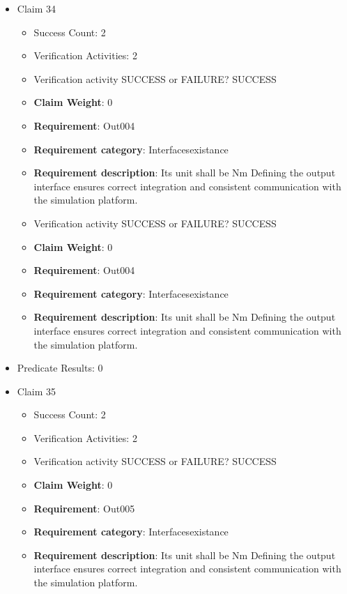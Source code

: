 \documentclass{article}
\begin{document}
\begin{itemize}
  				  \item Claim 34
				\begin{itemize}
			    	\item Success Count: 2 
			    	\item Verification Activities: 2
					\item Verification activity SUCCESS or FAILURE? SUCCESS
					\item \textbf{Claim Weight}: 0
						\item \textbf{Requirement}: Out004 
						\item \textbf{Requirement category}: Interfacesexistance 
						\item \textbf{Requirement description}: Its unit shall be Nm Defining the output interface ensures correct integration and consistent communication with the simulation platform.
					
					\item Verification activity SUCCESS or FAILURE? SUCCESS
					\item \textbf{Claim Weight}: 0
						\item \textbf{Requirement}: Out004 
						\item \textbf{Requirement category}: Interfacesexistance 
						\item \textbf{Requirement description}: Its unit shall be Nm Defining the output interface ensures correct integration and consistent communication with the simulation platform.
					
				\end{itemize}
				
									    
				\item Predicate Results: 0

  				  \item Claim 35
				\begin{itemize}
			    	\item Success Count: 2 
			    	\item Verification Activities: 2
					\item Verification activity SUCCESS or FAILURE? SUCCESS
					\item \textbf{Claim Weight}: 0
						\item \textbf{Requirement}: Out005 
						\item \textbf{Requirement category}: Interfacesexistance 
						\item \textbf{Requirement description}: Its unit shall be Nm Defining the output interface ensures correct integration and consistent communication with the simulation platform.
					

\end{itemize}
\end{itemize}
\end{document}
